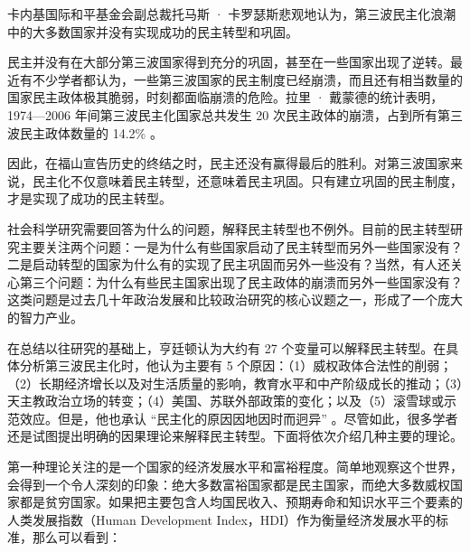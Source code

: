 卡内基国际和平基金会副总裁托马斯 · 卡罗瑟斯悲观地认为，第三波民主化浪潮中的大多数国家并没有实现成功的民主转型和巩固。


民主并没有在大部分第三波国家得到充分的巩固，甚至在一些国家出现了逆转。最近有不少学者都认为，一些第三波国家的民主制度已经崩溃，而且还有相当数量的国家民主政体极其脆弱，时刻都面临崩溃的危险。拉里 · 戴蒙德的统计表明，1974—2006 年间第三波民主化国家总共发生 20 次民主政体的崩溃，占到所有第三波民主政体数量的 14.2\% 。

因此，在福山宣告历史的终结之时，民主还没有赢得最后的胜利。对第三波国家来说，民主化不仅意味着民主转型，还意味着民主巩固。只有建立巩固的民主制度，才是实现了成功的民主转型。


社会科学研究需要回答为什么的问题，解释民主转型也不例外。目前的民主转型研究主要关注两个问题：一是为什么有些国家启动了民主转型而另外一些国家没有？二是启动转型的国家为什么有的实现了民主巩固而另外一些没有？当然，有人还关心第三个问题：为什么有些民主国家出现了民主政体的崩溃而另外一些国家没有？这类问题是过去几十年政治发展和比较政治研究的核心议题之一，形成了一个庞大的智力产业。

在总结以往研究的基础上，亨廷顿认为大约有 27 个变量可以解释民主转型。在具体分析第三波民主化时，他认为主要有 5 个原因：（1）威权政体合法性的削弱；（2）长期经济增长以及对生活质量的影响，教育水平和中产阶级成长的推动；（3）天主教政治立场的转变；（4）美国、苏联外部政策的变化；以及（5）滚雪球或示范效应。但是，他也承认 “民主化的原因因地因时而迥异” 。尽管如此，很多学者还是试图提出明确的因果理论来解释民主转型。下面将依次介绍几种主要的理论。

第一种理论关注的是一个国家的经济发展水平和富裕程度。简单地观察这个世界，会得到一个令人深刻的印象：绝大多数富裕国家都是民主国家，而绝大多数威权国家都是贫穷国家。如果把主要包含人均国民收入、预期寿命和知识水平三个要素的人类发展指数（Human Development Index，HDI）作为衡量经济发展水平的标准，那么可以看到：

